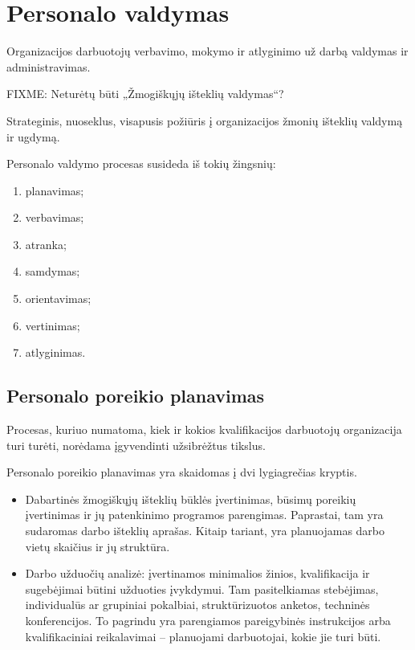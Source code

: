 \chapter{Personalo valdymas}

\begin{defn}
  Organizacijos darbuotojų verbavimo, mokymo ir atlyginimo už darbą
  valdymas ir administravimas.
\end{defn}

\begin{defn}
  FIXME: Neturėtų būti „Žmogiškųjų išteklių valdymas“?
  
  Strateginis, nuoseklus, visapusis požiūris į organizacijos žmonių
  išteklių valdymą ir ugdymą.
\end{defn}

Personalo valdymo procesas susideda iš tokių žingsnių:
\begin{enumerate}
  \item planavimas;
  \item verbavimas;
  \item atranka;
  \item samdymas;
  \item orientavimas;
  \item vertinimas;
  \item atlyginimas.
\end{enumerate}

\section{Personalo poreikio planavimas}

\begin{defn}
  Procesas, kuriuo numatoma, kiek ir kokios kvalifikacijos darbuotojų
  organizacija turi turėti, norėdama įgyvendinti užsibrėžtus
  tikslus.
\end{defn}

Personalo poreikio planavimas yra skaidomas į dvi lygiagrečias kryptis.
\begin{itemize}
  \item Dabartinės žmogiškųjų išteklių būklės įvertinimas, būsimų
    poreikių įvertinimas ir jų patenkinimo programos parengimas.
    Paprastai, tam yra sudaromas darbo išteklių aprašas. Kitaip tariant,
    yra planuojamas darbo vietų skaičius ir jų struktūra.
  \item Darbo užduočių analizė: įvertinamos minimalios žinios,
    kvalifikacija ir sugebėjimai būtini užduoties įvykdymui. Tam
    pasitelkiamas stebėjimas, individualūs ar grupiniai pokalbiai,
    struktūrizuotos anketos, techninės konferencijos. To pagrindu
    yra parengiamos pareigybinės instrukcijos arba kvalifikaciniai
    reikalavimai – planuojami darbuotojai, kokie jie turi būti.
\end{itemize}

